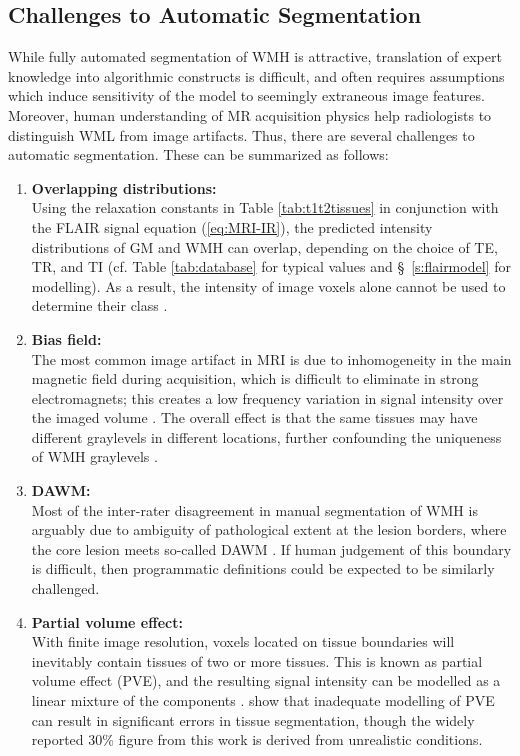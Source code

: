 \subsection{Challenges to Automatic Segmentation}\label{ss:autochallenges}
While fully automated segmentation of WMH is attractive, translation of expert knowledge into algorithmic constructs is difficult, and often requires assumptions which induce sensitivity of the model to seemingly extraneous image features. Moreover, human understanding of MR acquisition physics help radiologists to distinguish WML from image artifacts. Thus, there are several challenges to automatic segmentation. These can be summarized as follows:
\begin{enumerate}[itemsep=0pt,topsep=0pt]
  \item \label{chauto:overlap}     \textbf{Overlapping distributions:} \\
  Using the relaxation constants in Table \ref{tab:t1t2tissues} in conjunction with the FLAIR signal equation (\ref{eq:MRI-IR}), the predicted intensity distributions of GM and WMH can overlap, depending on the choice of TE, TR, and TI (cf. Table \ref{tab:database} for typical values and \S\ \ref{s:flairmodel} for modelling). As a result, the intensity of image voxels alone cannot be used to determine their class \cite{Mortazavi2012}.
  \item \label{chauto:bias}        \textbf{Bias field:} \\
  The most common image artifact in MRI is due to inhomogeneity in the main magnetic field during acquisition, which is difficult to eliminate in strong electromagnets; this creates a low frequency variation in signal intensity over the imaged volume \cite{Juntu2005}. The overall effect is that the same tissues may have different graylevels in different locations, further confounding the uniqueness of WMH graylevels \cite{Wardlaw2015}.
  \item \label{chauto:dawm}        \textbf{DAWM:} \\
  Most of the inter-rater disagreement in manual segmentation of WMH is arguably due to ambiguity of pathological extent at the lesion borders, where the core lesion meets so-called DAWM \cite{Ge2003}. If human judgement of this boundary is difficult, then programmatic definitions could be expected to be similarly challenged.
  \item \label{chauto:pva}         \textbf{Partial volume effect:} \\
  With finite image resolution, voxels located on tissue boundaries will inevitably contain tissues of two or more tissues. This is known as partial volume effect (PVE), and the resulting signal intensity can be modelled as a linear mixture of the components \cite{Santago1995}. \citeauthor{Niessen1999} \cite{Niessen1999} show that inadequate modelling of PVE can result in significant errors in tissue segmentation, though the widely reported 30\% figure from this work is derived from unrealistic conditions.

\end{enumerate}
